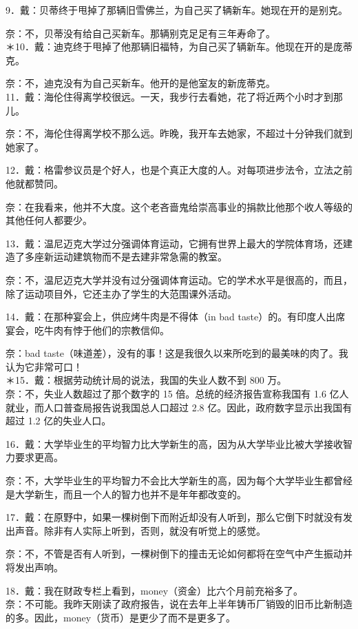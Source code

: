 9．戴：贝蒂终于甩掉了那辆旧雪佛兰，为自己买了辆新车。她现在开的是别克。

奈：不，贝蒂没有给自己买新车。那辆别克足足有三年寿命了。\\
＊10．戴：迪克终于甩掉了他那辆旧福特，为自己买了辆新车。他现在开的是庞蒂克。

奈：不，迪克没有为自己买新车。他开的是他室友的新庞蒂克。\\
11．戴：海伦住得离学校很远。一天，我步行去看她，花了将近两个小时才到那儿。

奈：不，海伦住得离学校不那么远。昨晚，我开车去她家，不超过十分钟我们就到她家了。

12．戴：格雷参议员是个好人，也是个真正大度的人。对每项进步法令，立法之前他就都赞同。

奈：在我看来，他并不大度。这个老吝啬鬼给崇高事业的捐款比他那个收人等级的其他任何人都要少。

13．戴：温尼迈克大学过分强调体育运动，它拥有世界上最大的学院体育场，还建造了多座新运动建筑物而不是去建非常急需的教室。

奈：不，温尼迈克大学并没有过分强调体育运动。它的学术水平是很高的，而且，除了运动项目外，它还主办了学生的大范围课外活动。

14．戴：在那种宴会上，供应烤牛肉是不得体（in bad taste）的。有印度人出席宴会，吃牛肉有悖于他们的宗教信仰。

奈：bad taste（味道差），没有的事！这是我很久以来所吃到的最美味的肉了。我认为它非常可口！\\
＊15．戴：根据劳动统计局的说法，我国的失业人数不到 800 万。\\
奈：不，失业人数超过了那个数字的 15 倍。总统的经济报告宣称我国有 1.6 亿人就业，而人口普查局报告说我国总人口超过 2.8 亿。因此，政府数字显示出我国有超过 1.2 亿的失业人口。

16．戴：大学毕业生的平均智力比大学新生的高，因为从大学毕业比被大学接收智力要求更高。

奈：不，大学毕业生的平均智力不会比大学新生的高，因为每个大学毕业生都曾经是大学新生，而且一个人的智力也并不是年年都改变的。

17．戴：在原野中，如果一棵树倒下而附近却没有人听到，那么它倒下时就没有发出声音。除非有人实际上听到，否则，就没有听觉上的感觉。

奈：不，不管是否有人听到，一棵树倒下的撞击无论如何都将在空气中产生振动并将发出声响。

18．戴：我在财政专栏上看到，money（资金）比六个月前充裕多了。\\
奈：不可能。我昨天刚读了政府报告，说在去年上半年铸币厂销毁的旧币比新制造的多。因此，money（货币）是更少了而不是更多了。

